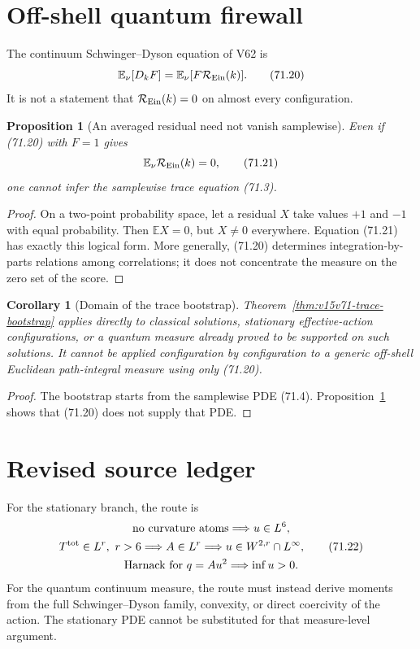 \documentclass[11pt]{article}
\newtheorem{proposition}[theorem]{Proposition}
\newtheorem{corollary}[theorem]{Corollary}
\theoremstyle{remark}
\begin{document}
\section{Off-shell quantum firewall}

The continuum Schwinger--Dyson equation of V62 is
\[
 \mathbb E_\nu[D_kF]
 =
 \mathbb E_\nu[F{\cal R}_{\rm Ein}(k)].                \tag{71.20}
\]
It is not a statement that
\({\cal R}_{\rm Ein}(k)=0\) on almost every configuration.

\begin{proposition}[An averaged residual need not vanish samplewise]
\label{prop:v15v71-off-shell}
Even if (71.20) with \(F=1\) gives
\[
 \mathbb E_\nu{\cal R}_{\rm Ein}(k)=0,                \tag{71.21}
\]
one cannot infer the samplewise trace equation (71.3).
\end{proposition}

\begin{proof}
On a two-point probability space, let a residual \(X\) take values
\(+1\) and \(-1\) with equal probability.  Then
\(\mathbb EX=0\), but \(X\ne0\) everywhere.  Equation (71.21) has
exactly this logical form.  More generally, (71.20) determines
integration-by-parts relations among correlations; it does not
concentrate the measure on the zero set of the score.
\end{proof}

\begin{corollary}[Domain of the trace bootstrap]
\label{cor:v15v71-domain}
Theorem~\ref{thm:v15v71-trace-bootstrap} applies directly to
classical solutions, stationary effective-action configurations,
or a quantum measure already proved to be supported on such
solutions.  It cannot be applied configuration by configuration to
a generic off-shell Euclidean path-integral measure using only
(71.20).
\end{corollary}

\begin{proof}
The bootstrap starts from the samplewise PDE (71.4).
Proposition~\ref{prop:v15v71-off-shell} shows that (71.20) does not
supply that PDE.
\end{proof}

\section{Revised source ledger}

For the stationary branch, the route is
\[
\begin{gathered}
\hbox{no curvature atoms}
\Longrightarrow u\in L^6,\\
T^{\rm tot}\in L^r,\ r>6
\Longrightarrow A\in L^r
\Longrightarrow u\in W^{2,r}\cap L^\infty,            \tag{71.22}\\
\hbox{Harnack for }q=Au^2
\Longrightarrow \inf u>0.
\end{gathered}
\]
For the quantum continuum measure, the route must instead derive
moments from the full Schwinger--Dyson family, convexity, or direct
coercivity of the action.  The stationary PDE cannot be substituted
for that measure-level argument.
\end{document}
